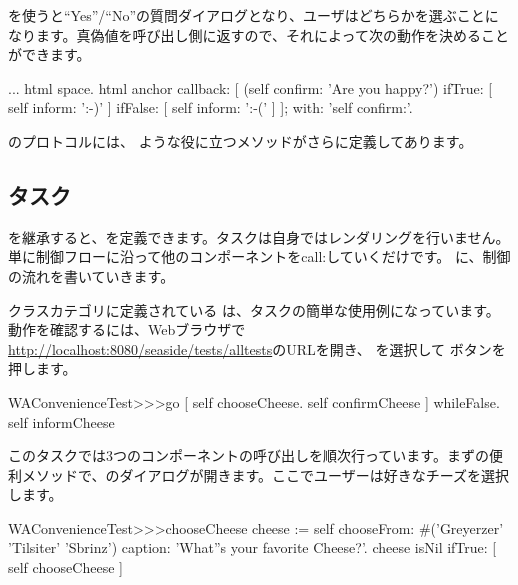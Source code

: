 \documentclass[a4paper,10pt,twoside]{book}
\begin{document}
 を使うと``Yes''/``No''の質問ダイアログとなり、ユーザはどちらかを選ぶことになります。真偽値を呼び出し側に返すので、それによって次の動作を決めることができます。

\begin{code}{}
...
	html space.
	html anchor
		callback: [
			(self confirm: 'Are you happy?')
				ifTrue: [ self inform: ':-)' ]
				ifFalse: [ self inform: ':-(' ]
			];
		with: 'self confirm:'.
\end{code}

のプロトコルには、 ような役に立つメソッドがさらに定義してあります。

\subsection{タスク}

 を継承すると、を定義できます。タスクは自身ではレンダリングを行いません。単に制御フローに沿って他のコンポーネントをcall:していくだけです。 に、制御の流れを書いていきます。

クラスカテゴリに定義されている は、タスクの簡単な使用例になっています。動作を確認するには、Webブラウザで \url{http://localhost:8080/seaside/tests/alltests}のURLを開き、  を選択して ボタンを押します。


\begin{code}{}
WAConvenienceTest>>>go
	[ self chooseCheese.
	  self confirmCheese ] whileFalse.
	self informCheese
\end{code}

このタスクでは3つのコンポーネントの呼び出しを順次行っています。まずの便利メソッドで、のダイアログが開きます。ここでユーザーは好きなチーズを選択します。

\begin{code}{}
WAConvenienceTest>>>chooseCheese
	cheese := self
		chooseFrom: #('Greyerzer' 'Tilsiter' 'Sbrinz')
		caption: 'What''s your favorite Cheese?'.
	cheese isNil ifTrue: [ self chooseCheese ]
\end{code}

\end{document}
